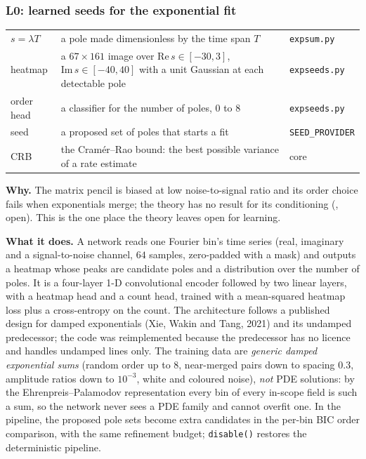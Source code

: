 \subsubsection{L0: learned seeds for the exponential fit}\label{sec:l0}
\begin{symbols}
\begin{tabular}{@{}L{2.6cm}L{6.0cm}L{4.3cm}@{}}
$s=\lambda T$ & a pole made dimensionless by the time span $T$ & \texttt{expsum.py}\\
heatmap & a $67\times161$ image over $\mathrm{Re}\,s\in[-30,3]$, $\mathrm{Im}\,s\in[-40,40]$ with a unit Gaussian at each detectable pole & \texttt{expseeds.py}\\
order head & a classifier for the number of poles, $0$ to $8$ & \texttt{expseeds.py}\\
seed & a proposed set of poles that starts a fit & \texttt{SEED\_PROVIDER}\\
CRB & the Cram\'er--Rao bound: the best possible variance of a rate estimate & core\\
\end{tabular}
\end{symbols}
\textbf{Why.} The matrix pencil is biased at low noise-to-signal ratio and its order choice fails when exponentials merge; the theory has no result for its conditioning (, open). This is the one place the theory leaves open for learning.

\textbf{What it does.} A network reads one Fourier bin's time series (real, imaginary and a signal-to-noise channel, $64$ samples, zero-padded with a mask) and outputs a heatmap whose peaks are candidate poles and a distribution over the number of poles. It is a four-layer 1-D convolutional encoder followed by two linear layers, with a heatmap head and a count head, trained with a mean-squared heatmap loss plus a cross-entropy on the count. The architecture follows a published design for damped exponentials (Xie, Wakin and Tang, 2021) and its undamped predecessor; the code was reimplemented because the predecessor has no licence and handles undamped lines only. The training data are \emph{generic damped exponential sums} (random order up to $8$, near-merged pairs down to spacing $0.3$, amplitude ratios down to $10^{-3}$, white and coloured noise), \emph{not} PDE solutions: by the Ehrenpreis--Palamodov representation every bin of every in-scope field is such a sum, so the network never sees a PDE family and cannot overfit one. In the pipeline, the proposed pole sets become extra candidates in the per-bin BIC order comparison, with the same refinement budget; \texttt{disable()} restores the deterministic pipeline.

